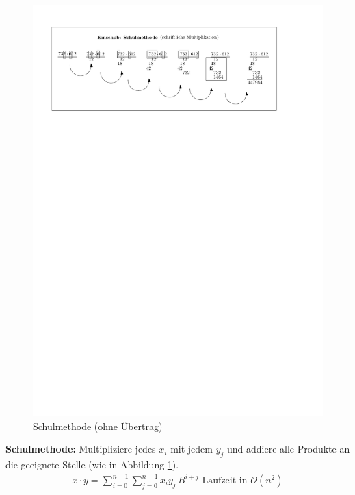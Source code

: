 \begin{figure}[h!]
    \begin{center}
        \includegraphics[width=\textwidth]{../GFX/vl4_fig_e1.pdf}
        \caption{Schulmethode (ohne Übertrag)}
        \label{fig:schulmethode}
    \end{center}
\end{figure}

\textbf{Schulmethode:} Multipliziere jedes $x_i$ mit jedem $y_j$ und addiere alle Produkte an die geeignete Stelle (wie in Abbildung \ref{fig:schulmethode}).\\
\begin{align*}
    x\cdot y =\sum\limits_{i=0}^{n-1}\sum\limits_{j=0}^{n-1} x_iy_j\,B^{i+j} \text{  Laufzeit in }\mathcal{O}(n^2)
\end{align*}

